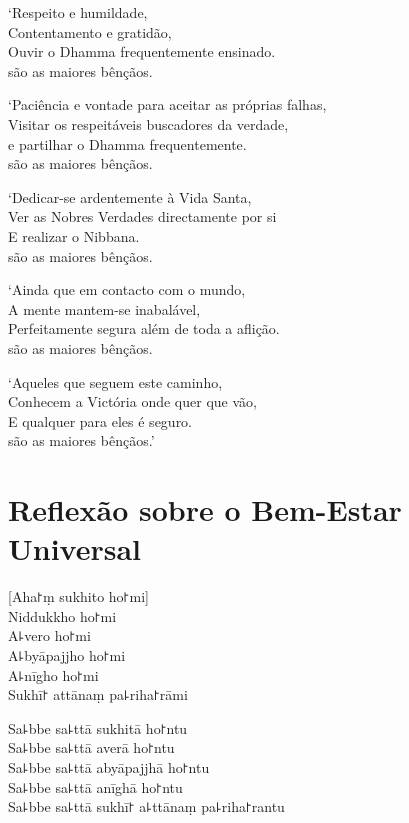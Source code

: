 `Respeito e humildade,\\
Contentamento e gratidão,\\
Ouvir o Dhamma frequentemente ensinado.\\
 são as maiores bênçãos.

`Paciência e vontade para aceitar as próprias falhas,\\
Visitar os respeitáveis buscadores da verdade,\\
e partilhar o Dhamma frequentemente.\\
 são as maiores bênçãos.

\clearpage

`Dedicar-se ardentemente à Vida Santa,\\
Ver as Nobres Verdades directamente por si\\
E realizar o Nibbana.\\
 são as maiores bênçãos.

`Ainda que em contacto com o mundo,\\
A mente mantem-se inabalável,\\
Perfeitamente segura além de toda a aflição.\\
 são as maiores bênçãos.

`Aqueles que seguem este caminho,\\
Conhecem a Victória onde quer que vão,\\
E qualquer  para eles é seguro.\\
 são as maiores bênçãos.'

\chapter*[Bem-Estar Universal]{Reflexão sobre o Bem-Estar Universal}

\delegateSetUseNext


\begin{leader}
\end{leader}

[Aha꜓ṃ sukhito ho꜓mi]\\
Niddukkho ho꜓mi\\
A꜕vero ho꜓mi\\
A꜕byāpajjho ho꜓mi\\
A꜕nīgho ho꜓mi\\
Sukhī꜓ attānaṃ pa꜕riha꜓rāmi

Sa꜕bbe sa꜕ttā sukhitā ho꜓ntu\\
Sa꜕bbe sa꜕ttā averā ho꜓ntu\\
Sa꜕bbe sa꜕ttā abyāpajjhā ho꜓ntu\\
Sa꜕bbe sa꜕ttā anīghā ho꜓ntu\\
Sa꜕bbe sa꜕ttā sukhī꜓ a꜕ttānaṃ pa꜕riha꜓rantu


